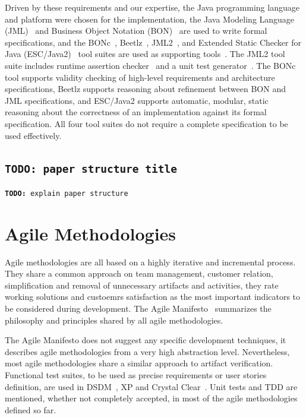 \documentclass[english]{lni}
\newcommand{\todo}[1]{\texttt{\textbf{TODO:} #1}}
\begin{document}
Driven by these requirements and our expertise, the Java programming
language and platform were chosen for the implementation, the Java
Modeling Language (JML)~\cite{LeavensBakerRuby-Prelim} and Business
Object Notation (BON)~\cite{WaldenNerson95} are used to write formal
specifications, and the BONc~\cite{BONc}, Beetlz~\cite{Beetlz},
JML2~\cite{JML2,JML2common}, and Extended Static Checker for Java
(ESC/Java2)~\cite{ESCJava2,KiniryCok04SmallCite} tool suites are used
as supporting tools~\cite{BurdyEtal05-STTT}.  The JML2 tool suite
includes runtime assertion checker~\cite{Cheon-Leavens02b} and a unit
test generator~\cite{Cheon2002}.  The BONc tool supports validity
checking of high-level requirements and architecture specifications,
Beetlz supports reasoning about refinement between BON and JML
specifications, and ESC/Java2 supports automatic, modular, static
reasoning about the correctness of an implementation against its
formal specification.  All four tool suites do not require a complete
specification to be used effectively.

\subsection{\todo{paper structure title}}

\todo{explain paper structure}



\section{Agile Methodologies}
\label{sec:agile_methodologies}

Agile methodologies are all based on a highly iterative and incremental process.
They share a common approach on team management, customer relation, simplification and removal of unnecessary artifacts and activities, they rate working solutions and custoemrs satisfaction as the most important indicators to be considered during development.
The Agile Manifesto~\cite{Beck2001} summarizes the philosophy and principles shared by all agile methodologies.

The Agile Manifesto does not suggest any specific development techniques, it describes agile methodologies from a very high abstraction level.
Nevertheless, most agile methodologies share a similar approach to artifact verification.
Functional test suites, to be used as precise requirements or user stories definition, are used in DSDM~\cite{Stapleton1997}, XP and Crystal Clear~\cite{Cockburn2004}. 
Unit tests and TDD are mentioned, whether not completely accepted, in most of the agile methodologies defined so far.
\end{document}

